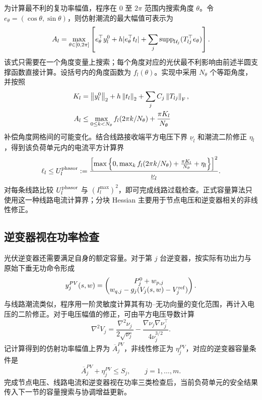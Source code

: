 为计算最不利的复功率幅值，程序在 $0$ 至 $2\pi$ 范围内搜索角度 $\theta$。令 $e_\theta=(\cos\theta,\sin\theta)$，则仿射潮流的最大幅值可表示为
\begin{equation}
A_l=\max_{\theta\in[0,2\pi]}
\left[e_\theta^\top y_l^0+
h|e_\theta^\top t_l|+
\sum_j\operatorname{supp}_{\mathcal U_j}(T_{lj}^\top e_\theta)\right].
\label{eq:angular}
\end{equation}
该式只需要在一个角度变量上搜索；每个角度对应的光伏最不利影响由前述半圆支撑函数直接计算。设括号内的角度函数为 $f_l(\theta)$。实现中采用 $N_\theta$ 个等距角度，并按照
\begin{align}
K_l&=\left\lVert y_l^0\right\rVert_2+h\left\lVert t_l\right\rVert_2+
\sum_jC_j\left\lVert T_{lj}\right\rVert_{\mathrm F},\label{eq:lip}\\
A_l&\le\max_{0\le k<N_\theta}
f_l(2\pi k/N_\theta)+\frac{\pi K_l}{N_\theta}
\label{eq:gridsafe}
\end{align}
补偿角度网格间的可能变化。结合线路接收端平方电压下界 $\underline\nu_l$ 和潮流二阶修正 $\eta_l$，得到该负荷单元内的电流平方计算界
\begin{equation}
\ell_l\le U_l^{\rm phasor}:=
\frac{\left[\max\left\{0,\max_k f_l(2\pi k/N_\theta)
+\frac{\pi K_l}{N_\theta}+\eta_l\right\}\right]^2}
{\underline\nu_l}.
\label{eq:phasor_bound}
\end{equation}
对每条线路比较 $U_l^{\rm phasor}$ 与 $(I_l^{\max})^2$，即可完成线路过载检查。正式容量算法只使用这一种线路电流计算界；分块 Hessian 主要用于节点电压和逆变器相关的非线性修正。

\subsection{逆变器视在功率检查}

光伏逆变器还需要满足自身的额定容量。对于第 $j$ 台逆变器，按实际有功出力与原始下垂无功命令形成
\begin{equation}
y_j^{PV}(s,w)=
\begin{pmatrix}
P_j^0+w_{p,j}\\
w_{q,j}-g_j(V_j(s,w)-V_j^{\rm ref})
\end{pmatrix}.
\end{equation}
与线路潮流类似，程序用一阶灵敏度计算其有功--无功向量的变化范围，再计入电压的二阶修正。对于电压幅值的修正，可由平方电压导数计算
\begin{equation}
\nabla^2 V_j=
\frac{\nabla^2\nu_j}{2\sqrt{\nu_j}}
-\frac{\nabla\nu_j\nabla\nu_j^\top}{4\nu_j^{3/2}}.
\end{equation}
记计算得到的仿射功率幅值上界为 $\overline A_j^{PV}$，非线性修正为 $\eta_j^{PV}$，对应的逆变器容量条件是
\begin{equation}
\overline A_j^{PV}+\eta_j^{PV}\le S_j,\qquad j=1,\ldots,m.
\label{eq:PVpass}
\end{equation}
完成节点电压、线路电流和逆变器视在功率三类检查后，当前负荷单元的安全结果传入下一节的容量搜索与协调增益更新。
